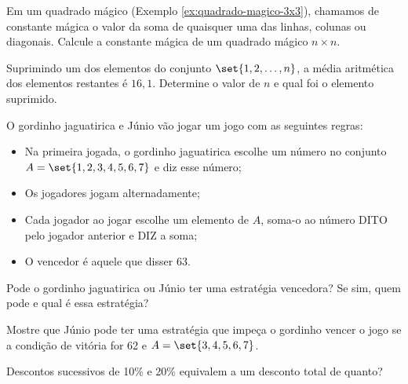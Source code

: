 \begin{exercise}
    Em um quadrado mágico (Exemplo \ref{ex:quadrado-magico-3x3}),
chamamos de constante mágica o valor da soma de quaisquer uma das
linhas, colunas ou diagonais. Calcule a constante mágica de um
quadrado mágico $n \times n$.
\end{exercise}




\begin{exercise}
Suprimindo um dos elementos do conjunto $\set{1, 2, \dots , n}$,
a média aritmética dos elementos restantes é $16{,}1$. Determine o
valor de $n$ e qual foi o elemento suprimido.    
\end{exercise}


\begin{exercise}
    O gordinho jaguatirica e Júnio vão jogar um  jogo com as
seguintes regras:
\begin{itemize}
  \item Na primeira jogada, o gordinho jaguatirica escolhe um número no
  conjunto $A = \set{1, 2, 3, 4, 5, 6, 7}$ e diz esse número;
  \item Os jogadores jogam alternadamente;
  \item Cada jogador ao jogar escolhe um elemento de $A$, soma-o ao
  número DITO pelo jogador anterior e DIZ a soma;
  \item O vencedor é aquele que disser 63.
\end{itemize}
Pode o gordinho jaguatirica ou Júnio ter uma estratégia vencedora?
Se sim, quem pode e qual é essa estratégia?
\end{exercise}



\begin{exercise}
    Mostre que Júnio pode ter uma estratégia que impeça o gordinho
vencer o jogo se a condição de vitória for 62 e $A =\set{3, 4, 5, 6,
7}$. 
\end{exercise}

\begin{exercise}
    Descontos sucessivos de 10\% e 20\% equivalem a um desconto
total de quanto?
\end{exercise}

